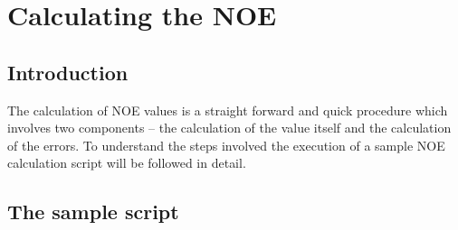 
\chapter{Calculating the NOE}




\section{Introduction}

The calculation of NOE values is a straight forward and quick procedure which involves two components -- the calculation of the value itself and the calculation of the errors.  To understand the steps involved the execution of a sample NOE calculation script will be followed in detail.




\section{The sample script}

